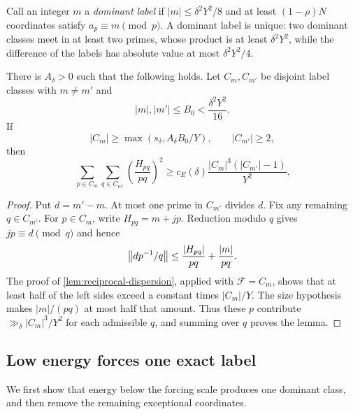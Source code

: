Call an integer $m$ a \emph{dominant label} if $|m|\leq\delta^2Y^2/8$ and at least $(1-\rho)N$ coordinates satisfy $a_p\equiv m\pmod p$. A dominant label is unique: two dominant classes meet in at least two primes, whose product is at least $\delta^2Y^2$, while the difference of the labels has absolute value at most $\delta^2Y^2/4$.

\begin{lemma}
\label{lem:cross-label-energy}
There is $A_\delta>0$ such that the following holds. Let $C_m,C_{m'}$ be disjoint label classes with $m\neq m'$ and
\[
 |m|,|m'|\leq B_0<\frac{\delta^2Y^2}{16}.
\]
If
\[
 |C_m|\geq\max(s_\delta,A_\delta B_0/Y),\qquad |C_{m'}|\geq2,
\]
then
\[
 \sum_{p\in C_m}\sum_{q\in C_{m'}}\left(\frac{H_{pq}}{pq}\right)^2
 \geq c_E(\delta)\frac{|C_m|^3(|C_{m'}|-1)}{Y^2}.
\]
\end{lemma}
\begin{proof}
Put $d=m'-m$. At most one prime in $C_{m'}$ divides $d$. Fix any remaining $q\in C_{m'}$. For $p\in C_m$, write $H_{pq}=m+jp$. Reduction modulo $q$ gives $jp\equiv d\pmod q$ and hence
\[
 \left\lVert dp^{-1}/q\right\rVert\leq\frac{|H_{pq}|}{pq}+\frac{|m|}{pq}.
\]
The proof of \cref{lem:reciprocal-dispersion}, applied with $\mathcal F=C_m$, shows that at least half of the left sides exceed a constant times $|C_m|/Y$. The size hypothesis makes $|m|/(pq)$ at most half that amount. Thus these $p$ contribute $\gg_\delta |C_m|^3/Y^2$ for each admissible $q$, and summing over $q$ proves the lemma.
\end{proof}

\subsection{Low energy forces one exact label}

We first show that energy below the forcing scale produces one dominant class, and then remove the remaining exceptional coordinates.


